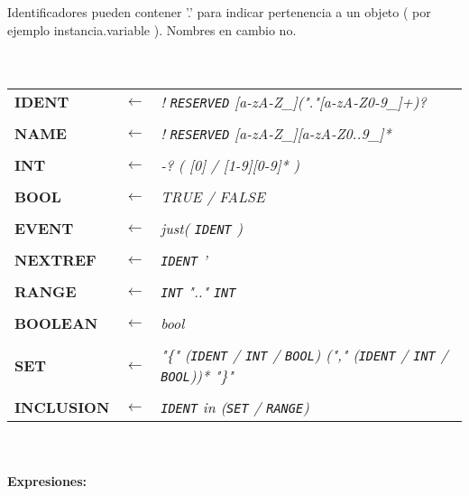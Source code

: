 \documentclass[titlepage, 12pt]{book}
\begin{document}
Identificadores pueden contener '.' para indicar pertenencia a un objeto ( por ejemplo instancia.variable ). Nombres en cambio no.\\
~\\\\
\begin{tabular}{>{\bfseries}ll>{\itshape}l}
IDENT & $\longleftarrow$ & ! \verb|RESERVED| [a-zA-Z\_]("."[a-zA-Z0-9\_]+)?\\\\
NAME & $\longleftarrow$ & ! \verb|RESERVED| [a-zA-Z\_][a-zA-Z0..9\_]*\\\\
INT & $\longleftarrow$ & -? ( [0] / [1-9][0-9]* )\\\\
BOOL & $\longleftarrow$ & TRUE / FALSE\\\\
EVENT & $\longleftarrow$ & just( \verb|IDENT| )\\\\
NEXTREF & $\longleftarrow$ & \verb|IDENT| '\\\\
RANGE & $\longleftarrow$ & \verb|INT| ".." \verb|INT|\\\\
BOOLEAN & $\longleftarrow$ & \textit{bool}\\\\
SET & $\longleftarrow$ & "\{" (\verb|IDENT| / \verb|INT| / \verb|BOOL|) ("," (\verb|IDENT| / \verb|INT| / \verb|BOOL|))* "\}"\\\\
INCLUSION & $\longleftarrow$ & \verb|IDENT| in (\verb|SET| / \verb|RANGE|)\\
\end{tabular}
~\\\\

\textbf{Expresiones:}\\
\end{document}
